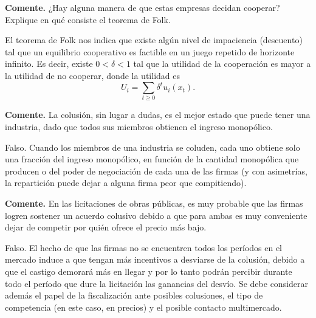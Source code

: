 \question \textbf{Comente.} ¿Hay alguna manera de que estas empresas decidan cooperar? Explique en qué consiste el teorema de Folk.
\begin{solution}
El teorema de Folk nos indica que existe algún nivel de impaciencia (descuento) tal que un equilibrio cooperativo es factible en un juego repetido de horizonte infinito. Es decir, existe $0 < \delta < 1$ tal que la utilidad de la cooperación es mayor a la utilidad de no cooperar, donde la utilidad es
\[
  U_i = \sum_{t \geq 0}\delta^t u_i(x_t).
\]

\end{solution}

\question \textbf{Comente.} La colusión, sin lugar a dudas, es el mejor estado que puede tener una industria, dado que todos sus miembros obtienen el ingreso monopólico.
\begin{solution}
Falso. Cuando los miembros de una industria se coluden, cada uno obtiene solo una fracción del ingreso monopólico, en función de la cantidad monopólica que producen o del poder de negociación de cada una de las firmas (y con asimetrías, la repartición puede dejar a alguna firma peor que compitiendo).

\end{solution}

\question \textbf{Comente.} En las licitaciones de obras públicas, es muy probable que las firmas logren sostener un acuerdo colusivo debido a que para ambas es muy conveniente dejar de competir por quién ofrece el precio más bajo.
\begin{solution}
Falso. El hecho de que las firmas no se encuentren todos los períodos en el mercado induce a que tengan más incentivos a desviarse de la colusión, debido a que el castigo demorará más en llegar y por lo tanto podrán percibir durante todo el período que dure la licitación las ganancias del desvío. Se debe considerar además el papel de la fiscalización ante posibles colusiones, el tipo de competencia (en este caso, en precios) y el posible contacto multimercado.

\end{solution}

